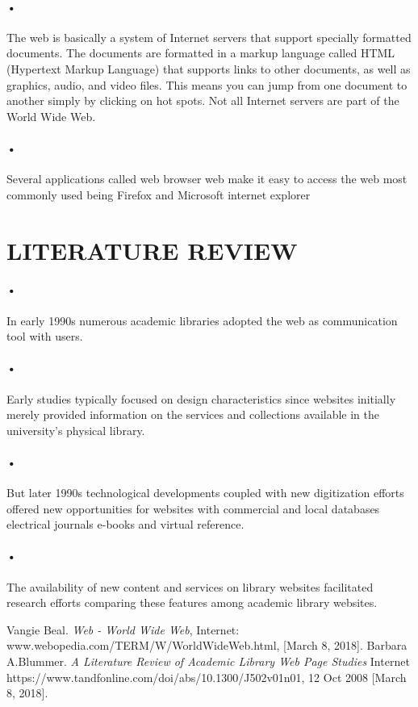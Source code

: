 \documentclass[7pt]{article}
\begin{document}
\paragraph{•}
The web is basically a system of Internet servers that support specially formatted documents. The documents are formatted in a markup language called HTML (Hypertext Markup Language) that supports links to other documents, as well as graphics, audio, and video files. This means you can jump from one document to another simply by clicking on hot spots. Not all Internet servers are part of the World Wide Web.\cite{beal}
\paragraph{•}
Several applications called web browser web make it easy to access the web most commonly used being Firefox and Microsoft internet explorer

\section{LITERATURE REVIEW}
\paragraph{•}
In early 1990s numerous academic libraries adopted the web as communication tool with users.
\paragraph{•}
Early studies typically focused on design characteristics since websites initially merely provided information on the services and collections available in the university’s physical library.
\paragraph{•}
But later 1990s technological developments coupled with new digitization efforts offered new opportunities for websites with commercial and local databases electrical journals e-books and virtual reference.
\paragraph{•}
The availability of new content and services on library websites facilitated research efforts comparing these features among academic library websites.\cite{barbara}

\begin{thebibliography}{9}
 Vangie Beal. \textit{Web - World Wide Web}, Internet: www.webopedia.com/TERM/W/World\textunderscore Wide\textunderscore Web.html, [March 8, 2018].
 Barbara A.Blummer. \textit{A Literature Review of Academic Library Web Page Studies} Internet https://www.tandfonline.com/doi/abs/10.1300/J502v01n01, 12 Oct 2008 [March 8, 2018].
\end{thebibliography}
\end{document}
